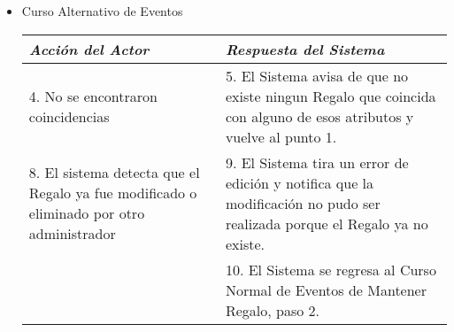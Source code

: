 \begin{itemize}
	\item Curso Alternativo de Eventos\\
		\begin{tabular}{|p{6.6cm}|p{6.6cm}|}\hline
			\emph{Acción del Actor} & \emph{Respuesta del Sistema}\\\hline
			4. No se encontraron coincidencias & 5. El Sistema avisa de que no existe ningun Regalo que coincida con alguno de esos atributos y vuelve al punto 1. \\\hline
			8. El sistema detecta que el Regalo ya fue modificado o eliminado por otro administrador& 9. El Sistema tira un error de edici\'on y notifica que la modificaci\'on no pudo ser realizada porque el Regalo ya no existe.\\\hline
			& 10. El Sistema se regresa al Curso Normal de Eventos de Mantener Regalo, paso 2.\\\hline
		\end{tabular}

\end{itemize}
